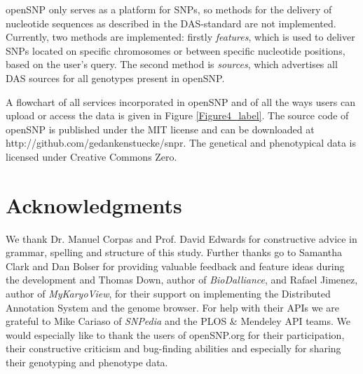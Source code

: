 \documentclass[10pt]{article}
\begin{document}
openSNP only serves as a platform for SNPs, so methods for the delivery of nucleotide sequences as described in the DAS-standard are not implemented. Currently, 
two methods are implemented: firstly \textit{features}, which is used to deliver SNPs located on specific chromosomes or between specific nucleotide positions, 
based on the user's query. The second method is \textit{sources}, which advertises all DAS sources for all genotypes present in openSNP.

A flowchart of all services incorporated in openSNP and of all the ways users can upload or access the data is given in Figure \ref{Figure4_label}. The source code of openSNP is 
published under the MIT license and can be downloaded at http://github.com/gedankenstuecke/snpr. The genetical and phenotypical data is licensed under Creative Commons Zero. 
\section*{Acknowledgments}
We thank Dr. Manuel Corpas and Prof. David Edwards for constructive advice in grammar, spelling and structure of this study. Further thanks go to Samantha Clark and Dan Bolser for providing valuable feedback and feature ideas during the development and Thomas Down, author of \emph{BioDalliance}, and Rafael Jimenez, author of \emph{MyKaryoView}, for their support on implementing the Distributed Annotation System and the genome browser. For help with their APIs we are grateful to Mike Cariaso of \emph{SNPedia} and the PLOS \& Mendeley API teams. We would especially like to thank the users of openSNP.org for their participation, their constructive criticism and bug-finding abilities and especially for sharing their genotyping and phenotype data.


\end{document}

